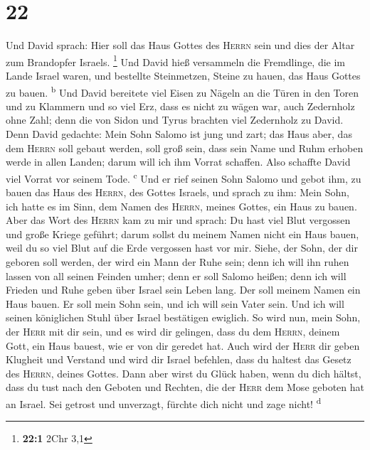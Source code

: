 \hypertarget{section-21}{%
\section{22}\label{section-21}}

 Und David sprach: Hier soll das Haus Gottes des
\textsc{Herrn} sein und dies der Altar zum Brandopfer Israels.
\footnote{\textbf{22:1} 2Chr 3,1}  Und David hieß
versammeln die Fremdlinge, die im Lande Israel waren, und bestellte
Steinmetzen, Steine zu hauen, das Haus Gottes zu bauen.
\textsuperscript{b}  Und David bereitete viel Eisen zu
Nägeln an die Türen in den Toren und zu Klammern und so viel Erz, dass
es nicht zu wägen war,  auch Zedernholz ohne Zahl; denn
die von Sidon und Tyrus brachten viel Zedernholz zu David.
 Denn David gedachte: Mein Sohn Salomo ist jung und zart;
das Haus aber, das dem \textsc{Herrn} soll gebaut werden, soll groß
sein, dass sein Name und Ruhm erhoben werde in allen Landen; darum will
ich ihm Vorrat schaffen. Also schaffte David viel Vorrat vor seinem
Tode. \textsuperscript{c}  Und er rief seinen Sohn Salomo
und gebot ihm, zu bauen das Haus des \textsc{Herrn}, des Gottes Israels,
 und sprach zu ihm: Mein Sohn, ich hatte es im Sinn, dem
Namen des \textsc{Herrn}, meines Gottes, ein Haus zu bauen.
 Aber das Wort des \textsc{Herrn} kam zu mir und sprach:
Du hast viel Blut vergossen und große Kriege geführt; darum sollst du
meinem Namen nicht ein Haus bauen, weil du so viel Blut auf die Erde
vergossen hast vor mir.  Siehe, der Sohn, der dir geboren
soll werden, der wird ein Mann der Ruhe sein; denn ich will ihn ruhen
lassen von all seinen Feinden umher; denn er soll Salomo heißen; denn
ich will Frieden und Ruhe geben über Israel sein Leben lang.
 Der soll meinem Namen ein Haus bauen. Er soll mein Sohn
sein, und ich will sein Vater sein. Und ich will seinen königlichen
Stuhl über Israel bestätigen ewiglich.  So wird nun, mein
Sohn, der \textsc{Herr} mit dir sein, und es wird dir gelingen, dass du
dem \textsc{Herrn}, deinem Gott, ein Haus bauest, wie er von dir geredet
hat.  Auch wird der \textsc{Herr} dir geben Klugheit und
Verstand und wird dir Israel befehlen, dass du haltest das Gesetz des
\textsc{Herrn}, deines Gottes.  Dann aber wirst du Glück
haben, wenn du dich hältst, dass du tust nach den Geboten und Rechten,
die der \textsc{Herr} dem Mose geboten hat an Israel. Sei getrost und
unverzagt, fürchte dich nicht und zage nicht! \textsuperscript{d}
